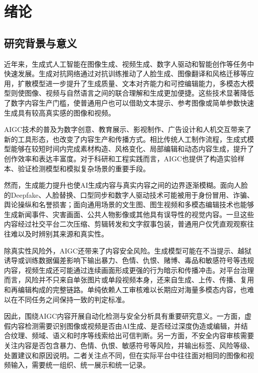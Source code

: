 
\chapter{绪论}

\section{研究背景与意义}

近年来，生成式人工智能在图像生成、视频生成、数字人驱动和智能创作等任务中快速发展。生成对抗网络通过对抗训练推动了人脸生成、图像翻译和风格迁移等应用，扩散模型进一步提升了生成质量、文本对齐能力和可控编辑能力，多模态大模型则使图像、视频与自然语言之间的联合理解和生成更加便捷\cite{ref1,ref4,ref6}。这些技术显著降低了数字内容生产门槛，使普通用户也可以借助文本提示、参考图像或简单参数快速生成具有较高真实感的图像和视频。

AIGC技术的普及为数字创意、教育展示、影视制作、广告设计和人机交互带来了新的工具形态，也改变了内容生产和传播方式。相比传统人工制作流程，生成式模型能够在较短时间内完成素材构造、风格变化、局部编辑和动态内容生成，提升了创作效率和表达丰富度。对于科研和工程实践而言，AIGC也提供了构造实验样本、验证检测模型和模拟复杂场景的重要手段。

然而，生成能力提升也使AI生成内容与真实内容之间的边界逐渐模糊。面向人脸的Deepfake、人脸替换、口型同步和数字人驱动技术可能被用于身份冒用、诈骗、舆论操纵和名誉损害；面向通用场景的文生图、图生视频和多模态编辑技术也能够生成新闻事件、灾害画面、公共人物影像或其他具有误导性的视觉内容。一旦这些内容经过社交平台二次压缩、剪辑转发和文字叙事包装，普通用户仅凭直观观察往往难以及时辨别其来源和真实性。

除真实性风险外，AIGC还带来了内容安全风险。生成模型可能在不当提示、越狱诱导或训练数据偏差影响下输出暴力、色情、仇恨、赌博、毒品和敏感符号等违规内容，视频生成还可能通过连续画面形成更强的行为暗示和传播冲击。对平台治理而言，风险并不只来自单张图片或单段视频本身，还来自生成、上传、传播、复用和再编辑构成的完整链路。单纯依赖人工审核难以长期应对海量多模态内容，也难以在不同任务之间保持一致的判定标准。

因此，围绕AIGC内容开展自动化检测与安全分析具有重要研究意义。一方面，虚假内容检测需要识别图像或视频是否由AI生成、是否经过深度伪造或编辑，并结合纹理、频域、语义和时序等线索给出可信判断\cite{ref9,ref10,ref22}。另一方面，不安全内容审核需要关注内容是否包含暴力、色情、仇恨、敏感符号等风险，并输出标签、风险等级、处置建议和原因说明。二者关注点不同，但在实际平台中往往面对相同的图像和视频输入，需要统一组织、统一展示和统一记录。

